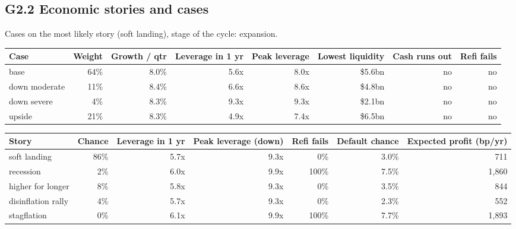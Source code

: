 \documentclass[11pt,a4paper]{article}
\begin{document}
\subsection*{G2.2 Economic stories and cases}
Cases on the most likely story (soft landing), stage of the cycle: expansion.
\begin{center}\scriptsize\setlength{\tabcolsep}{3.5pt}\begin{tabular}{@{}lrrrrrrr@{}}\toprule
Case & Weight & Growth / qtr & Leverage in 1 yr & Peak leverage & Lowest liquidity & Cash runs out & Refi fails \\\midrule
base & 64\% & 8.0\% & 5.6x & 8.0x & \$5.6bn & no & no \\
down moderate & 11\% & 8.4\% & 6.6x & 8.6x & \$4.8bn & no & no \\
down severe & 4\% & 8.3\% & 9.3x & 9.3x & \$2.1bn & no & no \\
upside & 21\% & 8.3\% & 4.9x & 7.4x & \$6.5bn & no & no \\
\bottomrule\end{tabular}\end{center}
\begin{center}\scriptsize\setlength{\tabcolsep}{3.5pt}\begin{tabular}{@{}lrrrrrr@{}}\toprule
Story & Chance & Leverage in 1 yr & Peak leverage (down) & Refi fails & Default chance & Expected profit (bp/yr) \\\midrule
soft landing & 86\% & 5.7x & 9.3x & 0\% & 3.0\% & 711 \\
recession & 2\% & 6.0x & 9.9x & 100\% & 7.5\% & 1,860 \\
higher for longer & 8\% & 5.8x & 9.3x & 0\% & 3.5\% & 844 \\
disinflation rally & 4\% & 5.7x & 9.3x & 0\% & 2.3\% & 552 \\
stagflation & 0\% & 6.1x & 9.9x & 100\% & 7.7\% & 1,893 \\
\bottomrule\end{tabular}\end{center}
\end{document}

